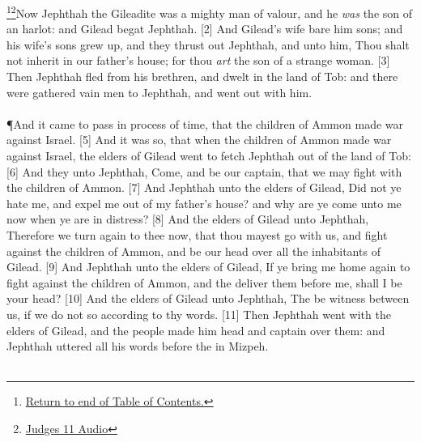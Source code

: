 \footnote{\textcolor[rgb]{0.00,0.25,0.00}{\hyperlink{JudgesTOC}{Return to end of Table of Contents.}}}\footnote{\href{https://audiobible.com/bible/judges_11.html}{\textcolor[cmyk]{0.99998,1,0,0}{Judges 11 Audio}}}\textcolor[cmyk]{0.99998,1,0,0}{Now Jephthah the Gileadite was a mighty man of valour, and he \emph{was} the son of an harlot: and Gilead begat Jephthah.}
[2] \textcolor[cmyk]{0.99998,1,0,0}{And Gilead's wife bare him sons; and his wife's sons grew up, and they thrust out Jephthah, and  unto him, Thou shalt not inherit in our father's house; for thou \emph{art} the son of a strange woman.}
[3] \textcolor[cmyk]{0.99998,1,0,0}{Then Jephthah fled from his brethren, and dwelt in the land of Tob: and there were gathered vain men to Jephthah, and went out with him.}\\
\\
\P \textcolor[cmyk]{0.99998,1,0,0}{And it came to pass in process of time, that the children of Ammon made war against Israel.}
[5] \textcolor[cmyk]{0.99998,1,0,0}{And it was so, that when the children of Ammon made war against Israel, the elders of Gilead went to fetch Jephthah out of the land of Tob:}
[6] \textcolor[cmyk]{0.99998,1,0,0}{And they  unto Jephthah, Come, and be our captain, that we may fight with the children of Ammon.}
[7] \textcolor[cmyk]{0.99998,1,0,0}{And Jephthah  unto the elders of Gilead, Did not ye hate me, and expel me out of my father's house? and why are ye come unto me now when ye are in distress?}
[8] \textcolor[cmyk]{0.99998,1,0,0}{And the elders of Gilead  unto Jephthah, Therefore we turn again to thee now, that thou mayest go with us, and fight against the children of Ammon, and be our head over all the inhabitants of Gilead.}
[9] \textcolor[cmyk]{0.99998,1,0,0}{And Jephthah  unto the elders of Gilead, If ye bring me home again to fight against the children of Ammon, and the  deliver them before me, shall I be your head?}
[10] \textcolor[cmyk]{0.99998,1,0,0}{And the elders of Gilead  unto Jephthah, The  be witness between us, if we do not so according to thy words.}
[11] \textcolor[cmyk]{0.99998,1,0,0}{Then Jephthah went with the elders of Gilead, and the people made him head and captain over them: and Jephthah uttered all his words before the  in Mizpeh.}\\
\\
